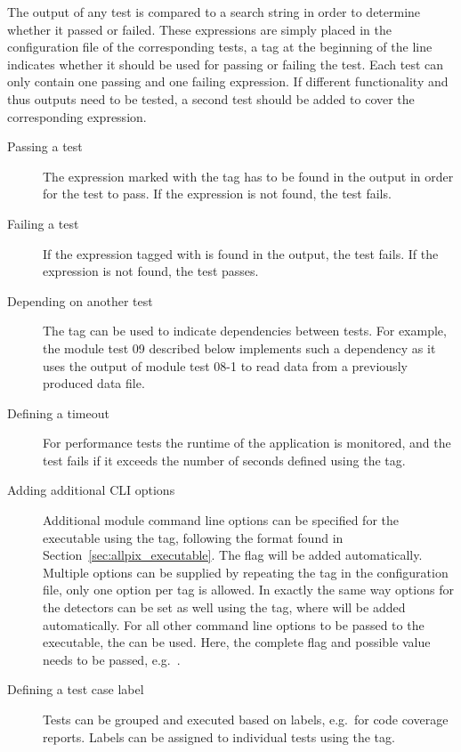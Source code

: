 The output of any test is compared to a search string in order to determine whether it passed or failed.
These expressions are simply placed in the configuration file of the corresponding tests, a tag at the beginning of the line indicates whether it should be used for passing or failing the test.
Each test can only contain one passing and one failing expression.
If different functionality and thus outputs need to be tested, a second test should be added to cover the corresponding expression.

\begin{description}
  \item[Passing a test] The expression marked with the tag  has to be found in the output in order for the test to pass. If the expression is not found, the test fails.
  \item[Failing a test] If the expression tagged with  is found in the output, the test fails. If the expression is not found, the test passes.
  \item[Depending on another test] The tag  can be used to indicate dependencies between tests. For example, the module test 09 described below implements such a dependency as it uses the output of module test 08-1 to read data from a previously produced \apsq data file.
  \item[Defining a timeout] For performance tests the runtime of the application is monitored, and the test fails if it exceeds the number of seconds defined using the  tag.
  \item[Adding additional CLI options] Additional module command line options can be specified for the  executable using the  tag, following the format found in Section~\ref{sec:allpix_executable}. The  flag will be added automatically. Multiple options can be supplied by repeating the  tag in the configuration file, only one option per tag is allowed. In exactly the same way options for the detectors can be set as well using the  tag, where  will be added automatically.
  For all other command line options to be passed to the executable, the  can be used. Here, the complete flag and possible value needs to be passed, e.g.\ .
  \item[Defining a test case label] Tests can be grouped and executed based on labels, e.g.\ for code coverage reports. Labels can be assigned to individual tests using the  tag.
\end{description}

